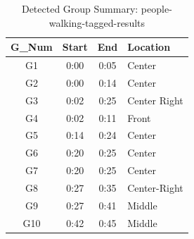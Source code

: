 \begin{table}[H]
    \centering
    \caption{Detected Group Summary: people-walking-tagged-results}
    \label{tab:group-summary-1}
    \begin{tabular}{c c c l}
        \toprule
        \textbf{G\_Num} & \textbf{Start} & \textbf{End} & \textbf{Location} \\
        \midrule
        G1 & 0:00 & 0:05 & Center \\
        G2 & 0:00 & 0:14 & Center \\
        G3 & 0:02 & 0:25 & Center Right \\
        G4 & 0:02 & 0:11 & Front \\
        G5 & 0:14 & 0:24 & Center \\
        G6 & 0:20 & 0:25 & Center \\
        G7 & 0:20 & 0:25 & Center \\
        G8 & 0:27 & 0:35 & Center-Right \\
        G9 & 0:27 & 0:41 & Middle \\
        G10 & 0:42 & 0:45 & Middle \\
        \bottomrule
    \end{tabular}
\end{table}
